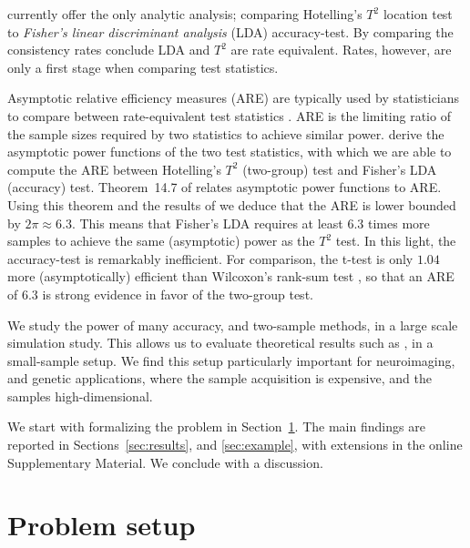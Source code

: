 \documentclass[]{bio}
\begin{document}
\cite{ramdas_classification_2016} currently offer the only analytic analysis; comparing Hotelling's $T^2$ location test to \emph{Fisher's linear discriminant analysis} (LDA) accuracy-test. 
By comparing the consistency rates \cite{ramdas_classification_2016} conclude LDA and $T^2$ are rate equivalent.
Rates, however, are only a first stage when comparing test statistics. 

Asymptotic relative efficiency measures (ARE) are typically used by statisticians to compare between rate-equivalent test statistics \citep{vaart_asymptotic_1998}.
ARE is the limiting ratio of the sample sizes required by two statistics to achieve similar power. 
\citet{ramdas_classification_2016} derive the asymptotic power functions of the two test statistics, with which we are able to compute the ARE between Hotelling's $T^2$ (two-group) test and Fisher's LDA (accuracy) test.
Theorem~14.7 of \cite{vaart_asymptotic_1998} relates asymptotic power functions to ARE.
Using this theorem and the results of \cite{ramdas_classification_2016} we deduce that the ARE is lower bounded by $2 \pi \approx 6.3$.
This means that Fisher's LDA requires at least $6.3$ times more samples to achieve the same (asymptotic) power as the $T^2$ test. 
In this light, the accuracy-test is remarkably inefficient.  
For comparison, the t-test is only $1.04$ more (asymptotically) efficient than Wilcoxon's rank-sum test \citep{lehmann_parametric_2009}, so that an ARE of $6.3$ is strong evidence in favor of the two-group test. 

We study the power of many accuracy, and two-sample methods, in a large scale simulation study. 
This allows us to evaluate theoretical results such as \citet{ramdas_classification_2016}, in a small-sample setup.
We find this setup particularly important for neuroimaging, and genetic applications, where the sample acquisition is expensive, and the samples high-dimensional. 

We start with formalizing the problem in Section~\ref{sec:problem_setup}.
The main findings are reported in Sections~\ref{sec:results}, and \ref{sec:example}, with extensions in the online Supplementary Material. 
We conclude with a discussion.







\section{Problem setup}
\label{sec:problem_setup}
\end{document}
